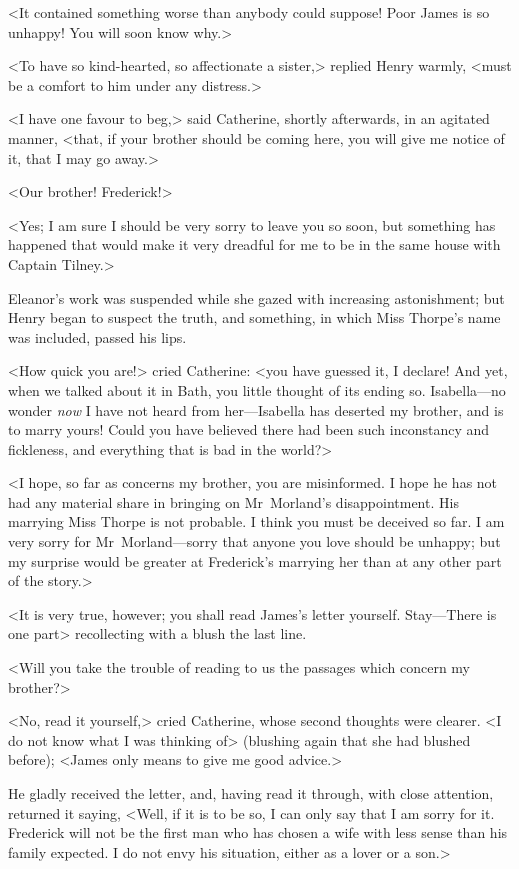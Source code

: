  <It contained something worse than anybody could suppose! Poor James is so unhappy! You will soon know why.> 

 <To have so kind-hearted, so affectionate a sister,> replied Henry warmly, <must be a comfort to him under any distress.> 

 <I have one favour to beg,> said Catherine, shortly afterwards, in an agitated manner, <that, if your brother should be coming here, you will give me notice of it, that I may go away.> 

 <Our brother! Frederick!> 

 <Yes; I am sure I should be very sorry to leave you so soon, but something has happened that would make it very dreadful for me to be in the same house with Captain Tilney.> 

 Eleanor's work was suspended while she gazed with increasing astonishment; but Henry began to suspect the truth, and something, in which Miss Thorpe's name was included, passed his lips. 

 <How quick you are!> cried Catherine: <you have guessed it, I declare! And yet, when we talked about it in Bath, you little thought of its ending so. Isabella—no wonder \textit{now} I have not heard from her—Isabella has deserted my brother, and is to marry yours! Could you have believed there had been such inconstancy and fickleness, and everything that is bad in the world?> 

 <I hope, so far as concerns my brother, you are misinformed. I hope he has not had any material share in bringing on Mr~Morland's disappointment. His marrying Miss Thorpe is not probable. I think you must be deceived so far. I am very sorry for Mr~Morland—sorry that anyone you love should be unhappy; but my surprise would be greater at Frederick's marrying her than at any other part of the story.> 

 <It is very true, however; you shall read James's letter yourself. Stay—There is one part\longdash> recollecting with a blush the last line. 

 <Will you take the trouble of reading to us the passages which concern my brother?> 

 <No, read it yourself,> cried Catherine, whose second thoughts were clearer. <I do not know what I was thinking of> (blushing again that she had blushed before); <James only means to give me good advice.> 

 He gladly received the letter, and, having read it through, with close attention, returned it saying, <Well, if it is to be so, I can only say that I am sorry for it. Frederick will not be the first man who has chosen a wife with less sense than his family expected. I do not envy his situation, either as a lover or a son.> 

